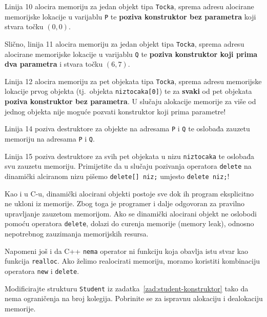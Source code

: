  Linija 10 alocira memoriju za jedan objekt tipa \texttt{Tocka}, sprema adresu alocirane memorijske lokacije u varijablu \texttt{P} te \textbf{poziva konstruktor bez parametra} koji stvara točku $(0,0)$.

 Slično, linija 11 alocira memoriju za jedan objekt tipa \texttt{Tocka}, sprema adresu alocirane memorijske lokacije u varijablu \texttt{Q} te \textbf{poziva konstruktor koji prima dva parametra} i stvara točku $(6, 7)$.

 Linija 12 alocira memoriju za pet objekata tipa \texttt{Tocka}, sprema adresu memorijske lokacije prvog objekta (tj.\ objekta \texttt{niz\textunderscore tocaka[0]}) te za \textbf{svaki} od pet objekata \textbf{poziva konstruktor bez parametra}. U slučaju alokacije memorije za više od jednog objekta nije moguće pozvati konstruktor koji prima parametre!
 
 Linija 14 poziva destruktore za objekte na adresama \texttt{P} i \texttt{Q} te oslobađa zauzetu memoriju na adresama \texttt{P} i \texttt{Q}.

 Linija 15 poziva destruktore za svih pet objekata u nizu \texttt{niz\textunderscore tocaka} te oslobađa svu zauzetu memoriju. Primijetite da u slučaju pozivanja operatora \texttt{delete} na dinamički alciranom nizu pišemo \texttt{delete[] niz;} umjesto \texttt{delete niz;}!

 \begin{napomena}
    Kao i u C-u, dinamički alocirani objekti postoje sve dok ih program eksplicitno ne ukloni iz memorije. Zbog toga je programer i dalje odgovoran za pravilno upravljanje zauzetom memorijom. Ako se dinamički alocirani objekt ne oslobodi pomoću operatora \texttt{delete}, dolazi do curenja memorije (memory leak), odnosno nepotrebnog zauzimanja memorijskih resursa.
 \end{napomena}

 Napomeni još i da C++ \texttt{nema} operator ni funkciju koja obavlja istu stvar kao funkcija \texttt{realloc}. Ako želimo realocirati memoriju, moramo koristiti kombinaciju operatora \texttt{new} i \texttt{delete}.
\medskip

\begin{zadatak}\label{zad:student-dinamicki}
    Modificirajte strukturu \texttt{Student} iz zadatka~\ref{zad:student-konstruktor} tako da nema ograničenja na broj kolegija. Pobrinite se za ispravnu alokaciju i dealokaciju memorije. 
\end{zadatak}

